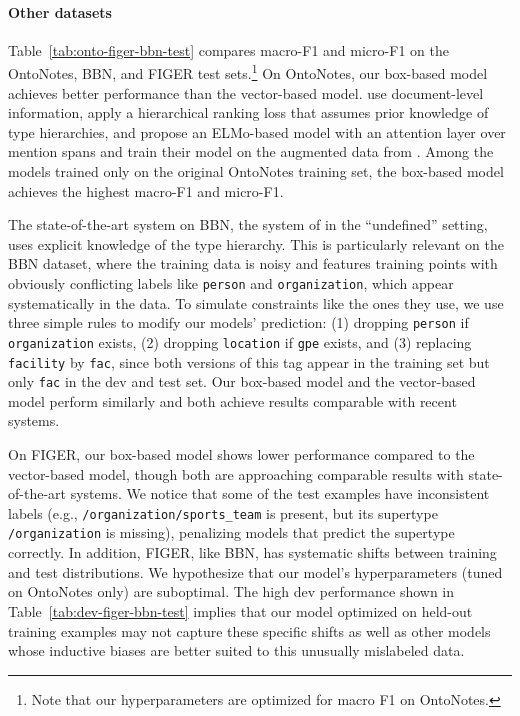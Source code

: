 \documentclass[11pt,a4paper]{article}
\begin{document}
\paragraph{Other datasets} Table~\ref{tab:onto-figer-bbn-test} compares macro-F1 and micro-F1 on the OntoNotes, BBN, and FIGER test sets.\footnote{Note that our hyperparameters are optimized for macro F1 on OntoNotes.} On OntoNotes, our box-based model achieves better performance than the vector-based model. \citet{Sheng_Zhang_18} use document-level information, \citet{Tongfei_Chen_20} apply a hierarchical ranking loss that assumes prior knowledge of type hierarchies, and \citet{Ying_Lin_19} propose an ELMo-based model with an attention layer over mention spans and train their model on the augmented data from \citet{Eunsol_Choi_18}. Among the models trained only on the original OntoNotes training set, the box-based model achieves the highest macro-F1 and micro-F1.

The state-of-the-art system on BBN, the system of \citet{Tongfei_Chen_20} in the ``undefined'' setting, uses explicit knowledge of the type hierarchy. This is particularly relevant on the BBN dataset, where the training data is noisy and features training points with obviously conflicting labels like {\tt person} and {\tt organization}, which appear systematically in the data. To simulate constraints like the ones they use, we use three simple rules to modify our models' prediction: (1) dropping {\tt person} if {\tt organization} exists, (2) dropping {\tt location} if {\tt gpe} exists, and (3) replacing {\tt facility} by {\tt fac}, since both versions of this tag appear in the training set but only {\tt fac} in the dev and test set. Our box-based model and the vector-based model perform similarly and both achieve results comparable with recent systems.

On FIGER, our box-based model shows lower performance compared to the vector-based model, though both are approaching comparable results with state-of-the-art systems. We notice that some of the test examples have inconsistent labels  (e.g., {\tt /organization/sports\_team} is present, but its supertype {\tt /organization} is missing), penalizing models that predict the supertype correctly. In addition, FIGER, like BBN, has systematic shifts between training and test distributions. We hypothesize that our model's hyperparameters (tuned on OntoNotes only) are suboptimal. The high dev performance shown in Table~\ref{tab:dev-figer-bbn-test} implies that our model optimized on held-out training examples may not capture these specific shifts as well as other models whose inductive biases are better suited to this unusually mislabeled data.
\end{document}
